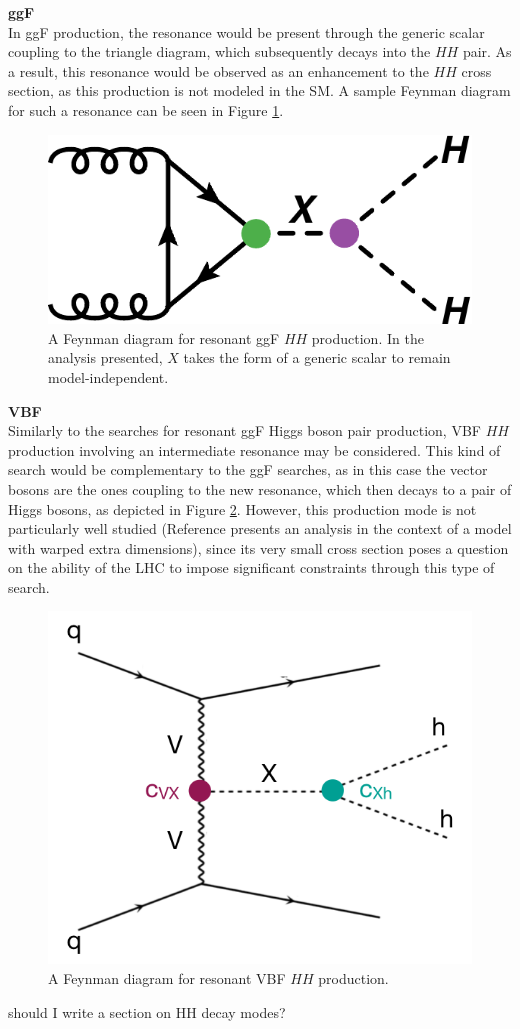 \noindent\textbf{\gls{ggF}}\\
\indent In \gls{ggF} production, the resonance would be present through the generic scalar coupling to the triangle diagram, which subsequently decays into the $HH$ pair. As a result, this resonance would be observed as an enhancement to the $HH$ cross section, as this production is not modeled in the \gls{SM}. A sample Feynman diagram for such a resonance can be seen in Figure \ref{fig:ggf-resonant}.


\begin{figure}[!ht]
    \centering
    \includegraphics[width=.6\textwidth]{chapters/chapter1_theory/images/hh_res_ggf.pdf}
    \caption{A Feynman diagram for resonant ggF  $HH$ production. In the analysis presented, $X$ takes the form of a generic scalar to remain model-independent.}
    \label{fig:ggf-resonant}
\end{figure}

\noindent\textbf{VBF}\\
\indent Similarly to the searches for resonant ggF Higgs boson pair production, \gls{VBF} $HH$
production involving an intermediate resonance may be considered. This kind of search would be complementary to the ggF searches, as in this case the vector bosons are the ones coupling to the new resonance, which then decays to a pair of Higgs bosons, as depicted in Figure \ref{fig:vbf-resonant}. However, this production mode is not
particularly well studied (Reference \cite{res_vbf} presents an analysis in the context of a model with warped extra dimensions), since its very small cross section poses a question on the ability of the LHC to impose significant constraints through this type of search.

\begin{figure}[!ht]
    \centering
    \includegraphics[width=.55\textwidth]{chapters/chapter1_theory/images/vbf_resonant.png}
    \caption{A Feynman diagram for resonant VBF $HH$ production.}
    \label{fig:vbf-resonant}
\end{figure}

{\color{red} should I write a section on HH decay modes?}